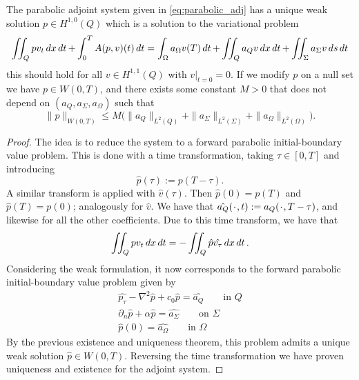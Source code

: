 \begin{lemma}
The parabolic adjoint system given in \eqref{eq:parabolic_adj} has a unique weak solution $p \in H^{1,0}(Q)$ which is a solution to the variational problem 
\begin{equation*}
    \iint_Q pv_t \mathop{dx}\mathop{dt} + \int_0^TA(p,v)(t)\mathop{dt} = \int_{\Omega}a_{\Omega}v(T) \mathop{dt} + \iint_Q a_Qv \mathop{dx}\mathop{dt} + \iint_{\Sigma}a_{\Sigma}v \mathop{ds}\mathop{dt}
\end{equation*}
this should hold for all $v \in H^{1,1}(Q)$ with $v|_{t=0} = 0$. If we modify $p$ on a null set we have $p\in W(0,T)$, and there exists some constant $M>0$ that does not depend on $(a_Q,a_{\Sigma}, a_{\Omega})$ such that 
\begin{equation*}
    \|p\|_{W(0,T)} \leq M \bigg (\|a_Q\|_{L^2(Q)} + \|a_{\Sigma}\|_{L^2(\Sigma)} + \|a_{\Omega}\|_{L^2(\Omega)} \bigg ).
\end{equation*}
\end{lemma}

\begin{proof}
The idea is to reduce the system to a forward parabolic initial-boundary value problem. This is done with a time transformation, taking $\tau \in [0,T]$ and introducing
\begin{equation*}
    \hat{p}(\tau) := p(T-\tau).
\end{equation*}
A similar transform is applied with $\hat{v}(\tau)$. Then $\hat{p}(0) = p(T)$ and $\hat{p}(T) = p(0)$; analogously for $\hat{v}$. We have that $\hat{a_Q}(\placeholder,t):= a_Q(\placeholder,T-\tau)$, and likewise for all the other coefficients. Due to this time transform, we have that
\begin{equation*}
    \iint_Qpv_t \mathop{dx}\mathop{dt} = - \iint_Q \hat{p}\hat{v_{\tau}} \mathop{dx}\mathop{dt}.
\end{equation*}
Considering the weak formulation, it now corresponds to the forward parabolic initial-boundary value problem given by 
\begin{align*}
    \hat{p_{\tau}} - \nabla^2 \hat{p} + c_0 \hat{p} = \hat{a_Q} \qquad \text{in } Q \\
    \partial_n \hat{p} + \alpha \hat{p} = \hat{a_{\Sigma}} \qquad \text{on } \Sigma \\
    \hat{p}(0) = \hat{a_{\Omega}} \qquad \text{in } \Omega
\end{align*}
By the previous existence and uniqueness theorem, this problem admits a unique weak solution $\hat{p} \in W(0,T)$. Reversing the time transformation we have proven uniqueness and existence for the adjoint system.
\end{proof}

